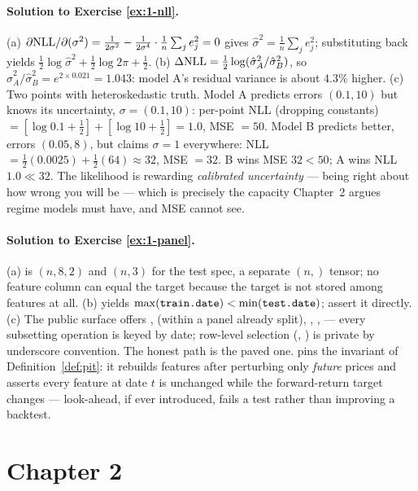 \paragraph{Solution to Exercise \ref{ex:1-nll}.}
(a) $\partial \mathrm{NLL}/\partial(\sigma^2) =
\frac{1}{2\sigma^2} - \frac{1}{2\sigma^4}\cdot\frac1n\sum_j e_j^2 = 0$
gives $\hat\sigma^2 = \frac1n\sum_j e_j^2$; substituting back yields
$\tfrac12\log\hat\sigma^2 + \tfrac12\log 2\pi + \tfrac12$.
(b) $\Delta\mathrm{NLL} = \tfrac12 \log(\hat\sigma_A^2/\hat\sigma_B^2)$, so
$\hat\sigma_A^2/\hat\sigma_B^2 = e^{2 \times 0.021} = 1.043$: model A's
residual variance is about $4.3\%$ higher. (c) Two points with
heteroskedastic truth. Model A predicts errors $(0.1, 10)$ but knows its
uncertainty, $\sigma = (0.1, 10)$: per-point NLL (dropping constants)
$= [\log 0.1 + \tfrac12] + [\log 10 + \tfrac12] = 1.0$, MSE $= 50$. Model B
predicts better, errors $(0.05, 8)$, but claims $\sigma = 1$ everywhere:
NLL $= \tfrac12(0.0025) + \tfrac12(64) \approx 32$, MSE $= 32$. B wins MSE
$32 < 50$; A wins NLL $1.0 \ll 32$. The likelihood is rewarding
\emph{calibrated uncertainty} --- being right about how wrong you will be
--- which is precisely the capacity Chapter~2 argues regime models must
have, and MSE cannot see.

\paragraph{Solution to Exercise \ref{ex:1-panel}.}
(a)  is $(n, 8, 2)$ and  $(n, 3)$ for the test
spec,  a separate $(n,)$ tensor; no feature column can equal the
target because the target is not stored among features at all.
(b)  yields
$\max(\texttt{train.date}) < \min(\texttt{test.date})$; assert it directly.
(c) The public surface offers , 
(within a panel already split), ,
,  --- every subsetting operation
is keyed by date; row-level selection (, ) is
private by underscore convention. The honest path is the paved one.
 pins the invariant of
Definition~\ref{def:pit}: it rebuilds features after perturbing only
\emph{future} prices and asserts every feature at date $t$ is unchanged
while the forward-return target changes --- look-ahead, if ever introduced,
fails a test rather than improving a backtest.

\section*{Chapter 2}

